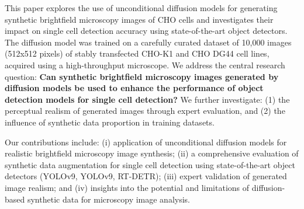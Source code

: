 This paper explores the use of unconditional diffusion models for generating synthetic brightfield microscopy images of CHO cells and investigates their impact on single cell detection accuracy using state-of-the-art object detectors.
The diffusion model was trained on a carefully curated dataset of 10,000 images (512x512 pixels) of stably transfected CHO-K1 and CHO DG44 cell lines, acquired using a high-throughput microscope.
We address the central research question: \textbf{Can synthetic brightfield microscopy images generated by diffusion models be used to enhance the performance of object detection models for single cell detection?}
We further investigate: (1) the perceptual realism of generated images through expert evaluation, and (2) the influence of synthetic data proportion in training datasets.

Our contributions include: (i) application of unconditional diffusion models for realistic brightfield microscopy image synthesis;
(ii) a comprehensive evaluation of synthetic data augmentation for single cell detection using state-of-the-art object detectors (YOLOv9, YOLOv9, RT-DETR);
(iii) expert validation of generated image realism;
and (iv) insights into the potential and limitations of diffusion-based synthetic data for microscopy image analysis.
